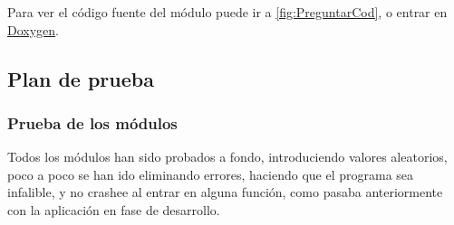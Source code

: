 Para ver el código fuente del módulo puede ir a \ref{fig:PreguntarCod}, o entrar en \href{DOC_DOXYGEN/preguntar_8h_source.html}{Doxygen}.
\label{fig:Preguntar}

\subsection{Plan de prueba}

\subsubsection{Prueba de los módulos}

Todos los módulos han sido probados a fondo, introduciendo valores aleatorios, poco a poco se han ido eliminando errores, haciendo que el programa sea infalible,
y no crashee al entrar en alguna función, como pasaba anteriormente con la aplicación en fase de desarrollo.

